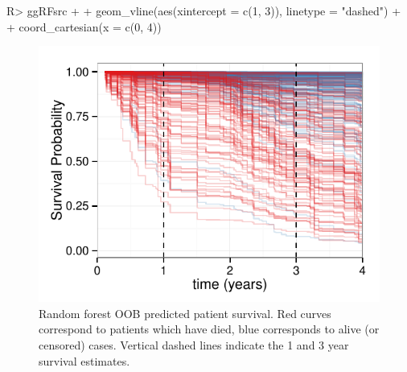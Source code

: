 \documentclass[nojss]{jss}\usepackage[]{graphicx}\usepackage[]{color}
\makeatletter
\def\maxwidth{ %
  \ifdim\Gin@nat@width>\linewidth
    \linewidth
  \else
    \Gin@nat@width
  \fi
}
\makeatother
\begin{document}
\begin{Schunk}
\begin{Sinput}
R> ggRFsrc + 
+   geom_vline(aes(xintercept = c(1, 3)), linetype = "dashed") + 
+   coord_cartesian(x = c(0, 4))
\end{Sinput}
\begin{figure}[!htpb]

{\centering \includegraphics[width=\maxwidth]{figure/rfs-rfsrc-plot3Mnth-1} 

}

\caption[Random forest OOB predicted patient survival]{Random forest OOB predicted patient survival. Red curves correspond to patients which have died, blue corresponds to alive (or censored) cases. Vertical dashed lines indicate the 1 and 3 year survival estimates.\label{fig:rfsrc-plot3Mnth}}
\end{figure}
\end{Schunk}
\end{document}
